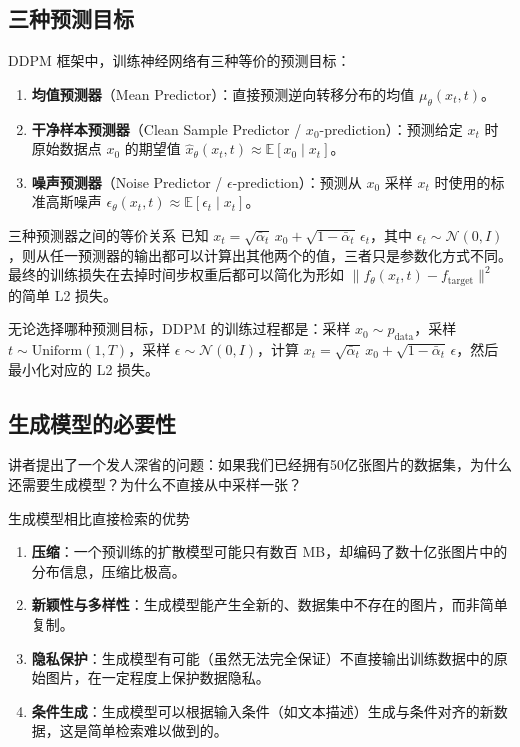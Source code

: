\subsection{三种预测目标}

DDPM 框架中，训练神经网络有三种等价的预测目标：

\begin{enumerate}
    \item \textbf{均值预测器}（Mean Predictor）：直接预测逆向转移分布的均值 $\mu_\theta(x_t, t)$。
    \item \textbf{干净样本预测器}（Clean Sample Predictor / $x_0$-prediction）：预测给定 $x_t$ 时原始数据点 $x_0$ 的期望值 $\hat{x}_\theta(x_t, t) \approx \mathbb{E}[x_0 \mid x_t]$。
    \item \textbf{噪声预测器}（Noise Predictor / $\epsilon$-prediction）：预测从 $x_0$ 采样 $x_t$ 时使用的标准高斯噪声 $\epsilon_\theta(x_t, t) \approx \mathbb{E}[\epsilon_t \mid x_t]$。
\end{enumerate}

\begin{knowledgebox}{三种预测器之间的等价关系}
已知 $x_t = \sqrt{\bar{\alpha}_t}\, x_0 + \sqrt{1-\bar{\alpha}_t}\, \epsilon_t$，其中 $\epsilon_t \sim \mathcal{N}(0, I)$，则从任一预测器的输出都可以计算出其他两个的值，三者只是参数化方式不同。最终的训练损失在去掉时间步权重后都可以简化为形如 $\|f_\theta(x_t, t) - f_{\text{target}}\|^2$ 的简单 L2 损失。
\end{knowledgebox}

无论选择哪种预测目标，DDPM 的训练过程都是：采样 $x_0 \sim p_{\text{data}}$，采样 $t \sim \text{Uniform}(1,T)$，采样 $\epsilon \sim \mathcal{N}(0,I)$，计算 $x_t = \sqrt{\bar{\alpha}_t}\, x_0 + \sqrt{1-\bar{\alpha}_t}\, \epsilon$，然后最小化对应的 L2 损失。

\subsection{生成模型的必要性}

讲者提出了一个发人深省的问题：如果我们已经拥有50亿张图片的数据集，为什么还需要生成模型？为什么不直接从中采样一张？

\begin{importantbox}{生成模型相比直接检索的优势}
\begin{enumerate}
    \item \textbf{压缩}：一个预训练的扩散模型可能只有数百 MB，却编码了数十亿张图片中的分布信息，压缩比极高。
    \item \textbf{新颖性与多样性}：生成模型能产生全新的、数据集中不存在的图片，而非简单复制。
    \item \textbf{隐私保护}：生成模型有可能（虽然无法完全保证）不直接输出训练数据中的原始图片，在一定程度上保护数据隐私。
    \item \textbf{条件生成}：生成模型可以根据输入条件（如文本描述）生成与条件对齐的新数据，这是简单检索难以做到的。
\end{enumerate}
\end{importantbox}

